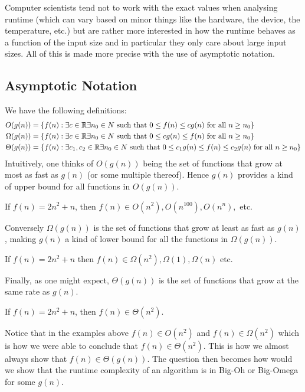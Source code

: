 Computer scientists tend not to work with the exact values when analysing runtime (which can vary based on minor things like the hardware, the device, the temperature, etc.) but are rather more interested in how the runtime behaves as a function of the input size and in particular they only care about large input sizes. All of this is made more precise with the use of asymptotic notation.

\subsection{Asymptotic Notation}
We have the following definitions:
\begin{align*}
    O(g(n)) &= \{f(n) : \exists c \in \mathbb{R} \exists n_0 \in N \text{ such that } 0 \leq f(n) \leq cg(n) \text{ for all } n \geq n_0\}\\
    \Omega(g(n)) &= \{f(n) : \exists c \in \mathbb{R} \exists n_0 \in N \text{ such that } 0 \leq cg(n) \leq f(n) \text{ for all } n \geq n_0\}\\
    \Theta(g(n)) &= \{f(n) : \exists c_1, c_2 \in \mathbb{R} \exists n_0 \in N \text{ such that } 0 \leq c_1 g(n) \leq f(n) \leq c_2 g(n) \text{ for all } n \geq n_0\}
\end{align*}
Intuitively, one thinks of $O(g(n))$ being the set of functions that grow at most as fast as $g(n)$ (or some multiple thereof). Hence $g(n)$ provides a kind of upper bound for all functions in $O(g(n))$. 
\begin{example}
If $f(n) = 2n^2 + n$, then $f(n) \in O(n^2), O(n^{100}), O(n^n),$ etc.
\end{example}

Conversely $\Omega(g(n))$ is the set of functions that grow at least as fast as $g(n)$, making $g(n)$ a kind of lower bound for all the functions in $\Omega(g(n))$.
\begin{example}
If $f(n) = 2n^2 + n$ then $f(n) \in \Omega(n^2), \Omega(1), \Omega(n)$ etc.
\end{example}

Finally, as one might expect, $\Theta(g(n))$ is the set of functions that grow at the same rate as $g(n)$.
\begin{example}
If $f(n) = 2n^2 + n$, then $f(n) \in \Theta(n^2)$.
\end{example}
Notice that in the examples above $f(n) \in O(n^2)$ and $f(n) \in \Omega(n^2)$ which is how we were able to conclude that $f(n) \in \Theta(n^2)$. This is how we almost always show that $f(n) \in \Theta(g(n))$. The question then becomes how would we show that the runtime complexity of an algorithm is in Big-Oh or Big-Omega for some $g(n)$. 

